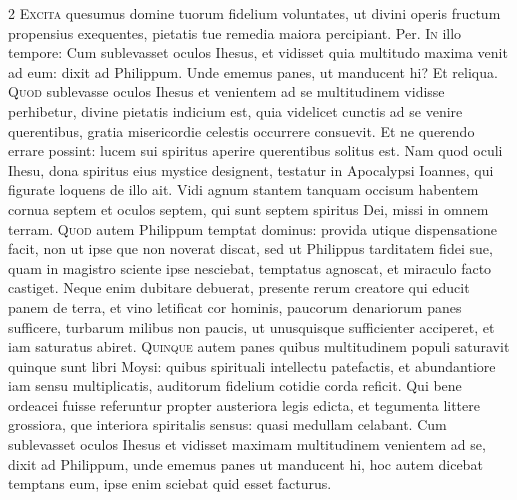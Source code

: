 \begin{multicols*}{2}
\lettrine[lines=2]{\zallmancaps \color{Red} E}{xcita} quesumus domine tuorum fidelium voluntates, ut divini operis fructum propensius exequentes, pietatis tue remedia maiora percipiant. Per.
\lettrine[lines=2]{\zallmancaps \color{Blue} I}{n} illo tempore: Cum sublevasset oculos Ihesus, et vidisset quia multitudo maxima venit ad eum: dixit ad Philippum. Unde ememus panes, ut manducent hi? Et reliqua.
 \grecross
\lettrine[lines=2]{\zallmancaps \color{Red} Q}{uod} sublevasse oculos Ihesus et venientem ad se multitudinem vidisse perhibetur, divine pietatis indicium est, quia videlicet cunctis ad se venire querentibus, gratia misericordie celestis occurrere consuevit. Et ne querendo errare possint: lucem sui spiritus aperire querentibus solitus est. Nam quod oculi Ihesu, dona spiritus eius mystice designent, testatur in Apocalypsi Ioannes, qui figurate loquens de illo ait. Vidi agnum stantem tanquam occisum habentem cornua septem et oculos septem, qui sunt septem spiritus Dei, missi in omnem terram.
\lettrine[lines=2]{\zallmancaps \color{Blue} Q}{uod} autem Philippum temptat dominus: provida utique dispensatione facit, non ut ipse que non noverat discat, sed ut Philippus tarditatem fidei sue, quam in magistro sciente ipse nesciebat, temptatus agnoscat, et miraculo facto castiget. Neque enim dubitare debuerat, presente rerum creatore qui educit panem de terra, et vino letificat cor hominis, paucorum denariorum panes sufficere, turbarum milibus non paucis, ut unusquisque sufficienter acciperet, et iam saturatus abiret.
\lettrine[lines=2]{\zallmancaps \color{Red} Q}{uinque} autem panes quibus multitudinem populi saturavit quinque sunt libri Moysi: quibus spirituali intellectu patefactis, et abundantiore iam sensu multiplicatis, auditorum fidelium cotidie corda reficit. Qui bene ordeacei fuisse referuntur propter austeriora legis edicta, et tegumenta littere grossiora, que interiora spiritalis sensus: quasi medullam celabant.
 Cum sublevasset oculos Ihesus et vidisset maximam multitudinem venientem ad se, dixit ad Philippum, unde ememus panes ut manducent hi, hoc autem dicebat temptans eum, ipse enim sciebat quid esset facturus.

\end{multicols*}
